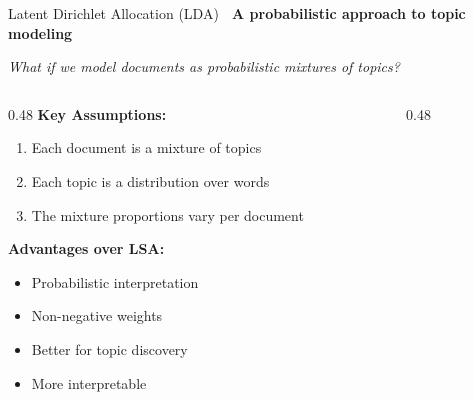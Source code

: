 \documentclass[aspectratio=169]{beamer}
\begin{document}
\begin{frame}[shrink=10]{Latent Dirichlet Allocation (LDA) 🎲}
\textbf{A probabilistic approach to topic modeling}

\vspace{1em}

\begin{center}
\Large
\textit{What if we model documents as probabilistic mixtures of topics?}
\end{center}

\vspace{1em}

\begin{columns}[T]
\begin{column}{0.48\textwidth}
\textbf{Key Assumptions:}
\begin{enumerate}\setlength{\itemsep}{0pt}
    \item Each document is a mixture of topics
    \item Each topic is a distribution over words
    \item The mixture proportions vary per document
\end{enumerate}

\vspace{0.5em}
\textbf{Advantages over LSA:}
\begin{itemize}\setlength{\itemsep}{0pt}
    \item Probabilistic interpretation
    \item Non-negative weights
    \item Better for topic discovery
    \item More interpretable
\end{itemize}
\end{column}

\begin{column}{0.48\textwidth}
\begin{center}
\end{center}
\end{column}
\end{columns}
\end{frame}
\end{document}
